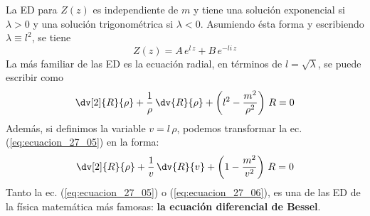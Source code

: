 \par
La ED para $Z(z)$ es independiente de $m$ y tiene una solución exponencial si $\lambda > 0$ y una solución trigonométrica si $\lambda < 0$. Asumiendo ésta forma y escribiendo $\lambda \equiv l^{2}$, se tiene
\begin{equation}
Z(z) = A \, e^{l \, z} + B \, e^{- li \, z}
\label{eq:ecuacion_27_04}
\end{equation}
La más familiar de las ED es la ecuación radial, en términos de $l = \sqrt{\lambda}$, se puede escribir como
\begin{equation}
\dv[2]{R}{\rho} + \dfrac{1}{\rho} \, \dv{R}{\rho} + \left( l^{2} - \dfrac{m^{2}}{\rho^{2}} \right) \, R = 0
\label{eq:ecuacion_27_05}
\end{equation}
Además, si definimos la variable $v = l\, \rho$, podemos transformar la ec. (\ref{eq:ecuacion_27_05}) en la forma:
\begin{equation}
\dv[2]{R}{\rho} + \dfrac{1}{v} \, \dv{R}{v} + \left( 1 - \dfrac{m^{2}}{v^{2}} \right) \, R = 0
\label{eq:ecuacion_27_06}
\end{equation}
Tanto la ec. (\ref{eq:ecuacion_27_05}) o (\ref{eq:ecuacion_27_06}), es una de las ED de la física matemática más famosas: \textbf{la ecuación diferencial de Bessel}.
